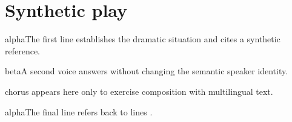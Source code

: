 \chapter{Synthetic play}
\begin{PSESpeech}{alpha}The first line establishes the dramatic situation and cites a synthetic reference.\autocite{synthetic-drama}\end{PSESpeech}
\begin{PSESpeech}{beta}A second voice answers without changing the semantic speaker identity.\end{PSESpeech}
\begin{PSESpeech}{chorus} appears here only to exercise composition with multilingual text.\end{PSESpeech}
\begin{PSESpeech}{alpha}The final line refers back to lines .\end{PSESpeech}
